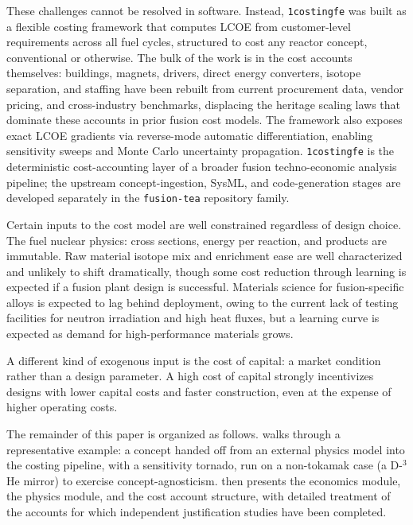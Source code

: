 \documentclass{article}
\begin{document}
These challenges cannot be resolved in software. Instead,
\texttt{1costingfe} was built as a flexible costing framework that
computes LCOE from customer-level requirements across all fuel
cycles, structured to cost any reactor concept, conventional
or otherwise. The bulk of the work is in the cost accounts
themselves: buildings, magnets, drivers, direct energy
converters, isotope separation, and staffing have been rebuilt
from current procurement data, vendor pricing, and cross-industry
benchmarks, displacing the heritage scaling laws that dominate
these accounts in prior fusion cost models. The framework also
exposes exact LCOE gradients via reverse-mode automatic
differentiation, enabling sensitivity sweeps and Monte Carlo
uncertainty propagation.
\texttt{1costingfe} is the deterministic cost-accounting layer of a broader fusion
techno-economic analysis pipeline; the upstream concept-ingestion,
SysML, and code-generation stages are developed separately in the
\texttt{fusion-tea} repository family.

Certain inputs to the cost model are well constrained regardless of design
choice. The fuel nuclear physics: cross sections, energy per reaction, and
products are immutable. Raw material isotope mix and enrichment ease are
well characterized and unlikely to shift dramatically, though some cost
reduction through learning is expected if a fusion plant design is successful.
Materials science for fusion-specific alloys is expected to lag behind deployment,
owing to the current lack of testing facilities for neutron irradiation and high heat fluxes,
but a learning curve is expected as demand for high-performance materials grows.

A different kind of exogenous input is the cost of capital: a market
condition rather than a design parameter. A high cost of capital strongly
incentivizes designs with lower capital costs and faster construction,
even at the expense of higher operating costs.

The remainder of this paper is organized as follows.
 walks through a representative example: a concept handed
off from an external physics model into the costing pipeline, with a
sensitivity tornado, run on a non-tokamak case (a D-${}^3$He mirror) to
exercise concept-agnosticism.
 then presents the economics module,
 the physics module, and
 the cost account structure, with detailed treatment of
the accounts for which independent justification studies have been completed.
\end{document}
